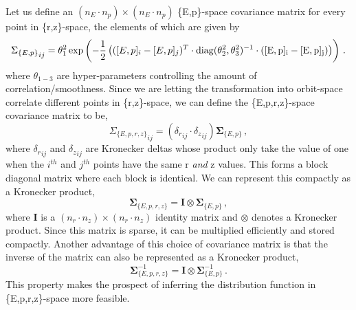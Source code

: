 Let us define an $(n_E \cdot n_p) \times (n_E \cdot n_p)$ \{E,p\}-space covariance matrix for every point in \{r,z\}-space, the elements of which are given by
\begin{equation}\label{eq:ep_covariance}
    {\Sigma_{\{E,p\}}}_{ij} = \theta_1^2 \exp \left (-\frac{1}{2}\left ( ([E,p]_i - [E, p]_j)^T\cdot \rm{diag}(\theta_2^2,\theta_3^2)^{-1} \cdot ([E, p]_i - [E, p]_j)\right ) \right )\,.
\end{equation}
where $\theta_{1-3}$ are hyper-parameters controlling the amount of correlation/smoothness. 
Since we are letting the transformation into orbit-space correlate different points in \{r,z\}-space, we can define the \{E,p,r,z\}-space covariance matrix to be, 
\begin{equation}\label{eq:eprz_covariance}
    {\Sigma_{\{E,p,r,z\}}}_{ij} = ({\delta_r}_{ij} \cdot {\delta_z}_{ij}) \mathbf{\Sigma}_{\{E,p\}}\,,
\end{equation}
where ${\delta_r}_{ij}$ and ${\delta_z}_{ij}$ are Kronecker deltas whose product only take the value of one when the $i^{th}$ and $j^{th}$ points have the same r \emph{and} z values. This forms a block diagonal matrix where each block is identical. We can represent this compactly as a Kronecker product,
\begin{equation}\label{eq:eprz_covariance_kron}
    \mathbf{\Sigma}_{\{E,p,r,z\}} = \mathbf{I} \otimes \mathbf{\Sigma}_{\{E,p\}}\,,
\end{equation}
where $\mathbf{I}$ is a $(n_r \cdot n_z) \times (n_r \cdot n_z)$ identity matrix and $\otimes$ denotes a Kronecker product. Since this matrix is sparse, it can be multiplied efficiently and  stored compactly.
Another advantage of this choice of covariance matrix is that the inverse of the matrix can also be represented as a Kronecker product,
\begin{equation}\label{eq:block_diag_inv}
    \mathbf{\Sigma}_{\{E,p,r,z\}}^{-1} = \mathbf{I} \otimes \mathbf{\Sigma}_{\{E,p\}}^{-1} \,.
\end{equation}
This property makes the prospect of inferring the distribution function in \{E,p,r,z\}-space more feasible.

